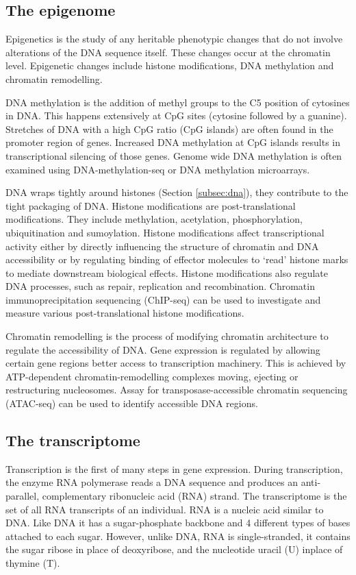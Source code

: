 \subsection{The epigenome}
Epigenetics is the study of any heritable phenotypic changes that do not involve alterations of the DNA sequence itself.
These changes occur at the chromatin level.
Epigenetic changes include histone modifications, DNA methylation and chromatin remodelling.

DNA methylation is the addition of methyl groups to the C5 position of cytosines in DNA.
This happens extensively at CpG sites (cytosine followed by a guanine).
Stretches of DNA with a high CpG ratio (CpG islands) are often found in the promoter region of genes.
Increased DNA methylation at CpG islands results in transcriptional silencing of those genes.
Genome wide DNA methylation is often examined using DNA-methylation-seq or DNA methylation microarrays.

DNA wraps tightly around histones (Section \ref{subsec:dna}), they contribute to the tight packaging of DNA.
Histone modifications are post-translational modifications.
They include methylation, acetylation, phosphorylation, ubiquitination and sumoylation.
Histone modifications affect transcriptional activity either by directly influencing the structure of chromatin and DNA accessibility or by regulating binding of effector molecules to `read' histone marks to mediate downstream biological effects.
Histone modifications also regulate DNA processes, such as repair, replication and recombination\cite{bannister2011regulation}.
Chromatin immunoprecipitation sequencing (ChIP-seq) can be used to investigate and measure various post-translational histone modifications.

Chromatin remodelling is the process of modifying chromatin architecture to regulate the accessibility of DNA.
Gene expression is regulated by allowing certain gene regions better access to transcription machinery.
This is achieved by ATP-dependent chromatin-remodelling complexes moving, ejecting or restructuring nucleosomes.
Assay for transposase-accessible chromatin sequencing (ATAC-seq) can be used to identify accessible DNA regions.


\subsection{The transcriptome}
Transcription is the first of many steps in gene expression.
During transcription, the enzyme RNA polymerase reads a DNA sequence and produces an anti-parallel, complementary ribonucleic acid (RNA) strand.
The transcriptome is the set of all RNA transcripts of an individual.
RNA is a nucleic acid similar to DNA. Like DNA it has a sugar-phosphate backbone and 4 different types of bases attached to each sugar.
However, unlike DNA, RNA is single-stranded, it contains the sugar ribose in place of deoxyribose, and the nucleotide uracil (U) inplace of thymine (T).


